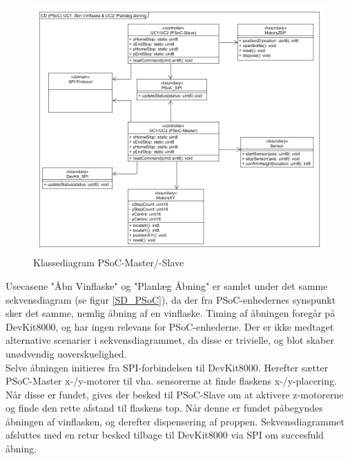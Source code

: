 \begin{figure}[H]
	\includegraphics[scale=0.4]{tex/Arkitektur/Fotos/SW/Klassediagram_PSoC}
	\caption{Klassediagram PSoC-Master/-Slave}
\end{figure}

Usecasene "Åbn Vinflaske" og "Planlæg Åbning" er samlet under det samme sekvensdiagram (se figur \ref{SD_PSoC}), da der fra PSoC-enhedernes synspunkt sker det samme, nemlig 
åbning af en vinflaske. Timing af åbningen foregår på DevKit8000, og har ingen relevans for PSoC-enhederne. Der er ikke medtaget alternative scenarier i 
sekvensdiagrammet, da disse er trivielle, og blot skaber unødvendig uoverskuelighed. \\

Selve åbningen initieres fra SPI-forbindelsen til DevKit8000. Herefter
sætter PSoC-Master x-/y-motorer til vha. sensorerne at finde flaskens x-/y-placering. Når disse er fundet, gives der besked til PSoC-Slave om at aktivere z-motorerne
og finde den rette afstand til flaskens top. Når denne er fundet påbegyndes åbningen af vinflasken, og derefter dispensering af proppen. Sekvensdiagrammet
afsluttes med en retur besked tilbage til DevKit8000 via SPI om succesfuld åbning.


